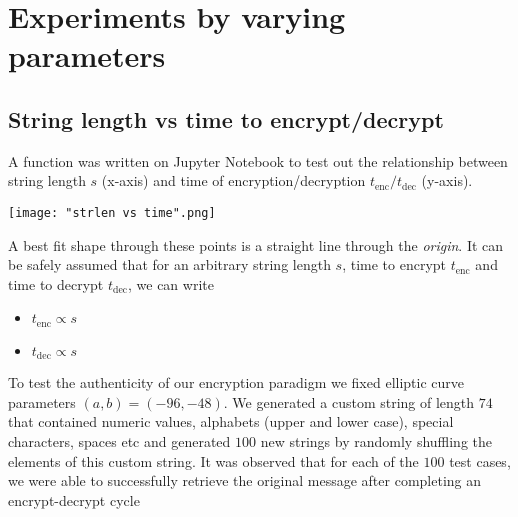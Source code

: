 \documentclass[a4paper,12pt]{article}
\begin{document}
\section{Experiments by varying parameters}
\subsection{String length vs time to encrypt/decrypt}
\begin{flushleft}
A function was written on Jupyter Notebook to test out the relationship between string length $s$ (x-axis) and time of encryption/decryption $t_{\text{enc}}/t_{\text{dec}}$ (y-axis).
\begin{center}
	\texttt{[image: "strlen vs time".png]}
\end{center}

A best fit shape through these points is a straight line through the \textit{origin}. It can be safely assumed that for an arbitrary string length $s$, time to encrypt $t_{\text{enc}}$ and time to decrypt $t_{\text{dec}}$, we can write
\end{flushleft}

\begin{itemize}
	\centering
	\item $t_{\text{enc}}\propto s$
	\item $t_{\text{dec}}\propto s$
\end{itemize}

\begin{flushleft}
To test the authenticity of our encryption paradigm we fixed elliptic curve parameters $(a,b)=(-96,-48)$. We generated a custom string of length $74$ that contained numeric values, alphabets (upper and lower case), special characters, spaces etc and generated $100$ new strings by randomly shuffling the elements of this custom string. It was observed that for each of the $100$ test cases, we were able to successfully retrieve the original message after completing an encrypt-decrypt cycle
\end{flushleft}
\end{document}
